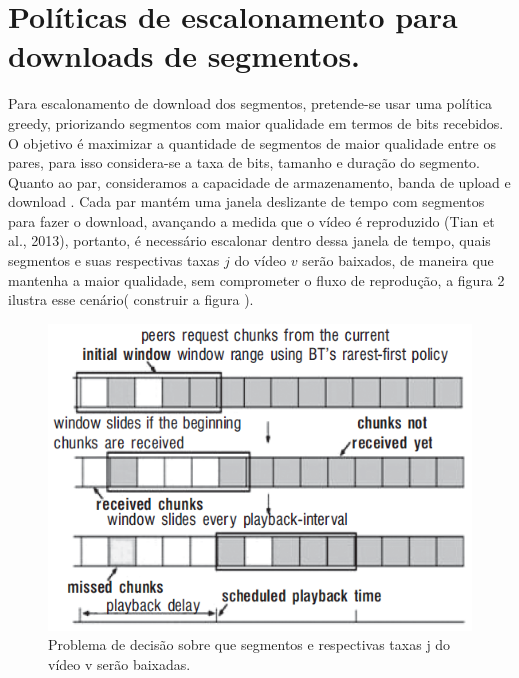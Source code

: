 \documentclass[
	12pt,
	oneside,
	a4paper,
	english,
	brazil
	]{abntex2ppgsi}
\begin{document}



\section{Políticas de escalonamento para downloads de segmentos.}

Para escalonamento de download dos segmentos, pretende-se usar uma política greedy, priorizando segmentos com maior qualidade em termos de bits recebidos.
O objetivo é maximizar a quantidade de segmentos de maior qualidade entre os pares, para isso considera-se a taxa de bits, tamanho e duração do segmento. Quanto ao par, consideramos a capacidade de armazenamento, banda de upload e download . Cada par mantém uma janela deslizante de tempo com segmentos para fazer o download, avançando a medida que o vídeo é reproduzido (Tian et al., 2013), portanto, é necessário escalonar dentro dessa janela de tempo, quais segmentos e suas respectivas taxas $j$ do vídeo $v$ serão baixados, de maneira que mantenha a maior qualidade, sem comprometer o fluxo de reprodução, a figura 2 ilustra esse cenário( construir a figura ).

\begin{figure}[H]%
	\centering
 	  \caption{Problema de decisão sobre que segmentos e respectivas taxas j do vídeo v serão baixadas.}
		\includegraphics{figuras/janeladetempo.png}
\end{figure}
\end{document}
